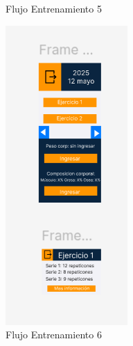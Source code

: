 \begin{figure}[H]
\begin{minipage}[b]{0.4\textwidth}
    \caption{Flujo Entrenamiento 5}
    \label{fig:Flujo Entrenamiento 5}
  \end{minipage}
  \begin{minipage}[b]{0.4\textwidth}
    \centering
    \includegraphics[width=\textwidth]{fotos/FE6.png}
    \caption{Flujo Entrenamiento 6}
    \label{fig:Flujo Entrenamiento 6}
  \end{minipage}
\end{figure}

